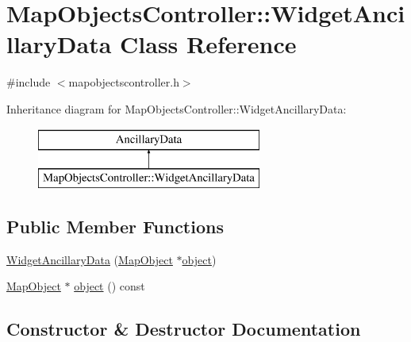 \hypertarget{class_map_objects_controller_1_1_widget_ancillary_data}{}\section{Map\+Objects\+Controller\+::Widget\+Ancillary\+Data Class Reference}
\label{class_map_objects_controller_1_1_widget_ancillary_data}


{\ttfamily \#include $<$mapobjectscontroller.\+h$>$}

Inheritance diagram for Map\+Objects\+Controller\+::Widget\+Ancillary\+Data\+:\begin{figure}[H]
\begin{center}
\leavevmode
\includegraphics[height=2.000000cm]{d1/dc1/class_map_objects_controller_1_1_widget_ancillary_data}
\end{center}
\end{figure}
\subsection*{Public Member Functions}
\begin{DoxyCompactItemize}
\item 
\mbox{\hyperlink{class_map_objects_controller_1_1_widget_ancillary_data_a1da613c9c56d70d8a532e89da98fd7a0}{Widget\+Ancillary\+Data}} (\mbox{\hyperlink{class_map_object}{Map\+Object}} $\ast$\mbox{\hyperlink{class_map_objects_controller_1_1_widget_ancillary_data_a78ab42237f6cd5c9e40cdb81f55a70f9}{object}})
\item 
\mbox{\hyperlink{class_map_object}{Map\+Object}} $\ast$ \mbox{\hyperlink{class_map_objects_controller_1_1_widget_ancillary_data_a78ab42237f6cd5c9e40cdb81f55a70f9}{object}} () const
\end{DoxyCompactItemize}


\subsection{Constructor \& Destructor Documentation}
\mbox{\label{class_map_objects_controller_1_1_widget_ancillary_data_a1da613c9c56d70d8a532e89da98fd7a0}} 
